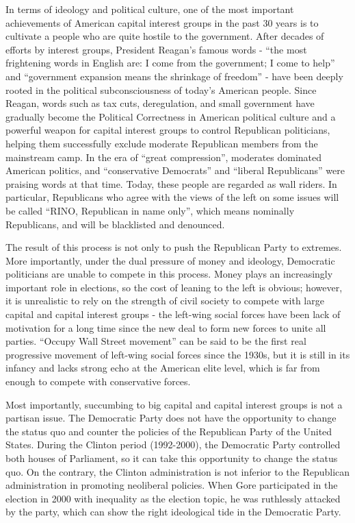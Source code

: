 \documentclass[11pt]{article}
\begin{document}
In terms of ideology and political culture, one of the most important achievements of American capital interest groups in the past 30 years is to cultivate a people who are quite hostile to the government. After decades of efforts by interest groups, President Reagan's famous words - “the most frightening words in English are: I come from the government; I come to help” and “government expansion means the shrinkage of freedom” - have been deeply rooted in the political subconsciousness of today's American people. Since Reagan, words such as tax cuts, deregulation, and small government have gradually become the Political Correctness in American political culture and a powerful weapon for capital interest groups to control Republican politicians, helping them successfully exclude moderate Republican members from the mainstream camp. In the era of “great compression”, moderates dominated American politics, and “conservative Democrats” and “liberal Republicans” were praising words at that time. Today, these people are regarded as wall riders. In particular, Republicans who agree with the views of the left on some issues will be called “RINO, Republican in name only”, which means nominally Republicans, and will be blacklisted and denounced.

The result of this process is not only to push the Republican Party to extremes. More importantly, under the dual pressure of money and ideology, Democratic politicians are unable to compete in this process. Money plays an increasingly important role in elections, so the cost of leaning to the left is obvious; however, it is unrealistic to rely on the strength of civil society to compete with large capital and capital interest groups - the left-wing social forces have been lack of motivation for a long time since the new deal to form new forces to unite all parties. “Occupy Wall Street movement” can be said to be the first real progressive movement of left-wing social forces since the 1930s, but it is still in its infancy and lacks strong echo at the American elite level, which is far from enough to compete with conservative forces.

Most importantly, succumbing to big capital and capital interest groups is not a partisan issue. The Democratic Party does not have the opportunity to change the status quo and counter the policies of the Republican Party of the United States. During the Clinton period (1992-2000), the Democratic Party controlled both houses of Parliament, so it can take this opportunity to change the status quo. On the contrary, the Clinton administration is not inferior to the Republican administration in promoting neoliberal policies. When Gore participated in the election in 2000 with inequality as the election topic, he was ruthlessly attacked by the party, which can show the right ideological tide in the Democratic Party.
\end{document}
